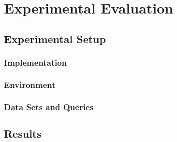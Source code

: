 \chapter{Experimental Evaluation}\label{\positionnumber} 

\section{Experimental Setup}\label{\positionnumber}
    \subsection{Implementation}\label{\positionnumber}
    \subsection{Environment}\label{\positionnumber}
    \subsection{Data Sets and Queries}\label{\positionnumber}

\section{Results}\label{\positionnumber}
